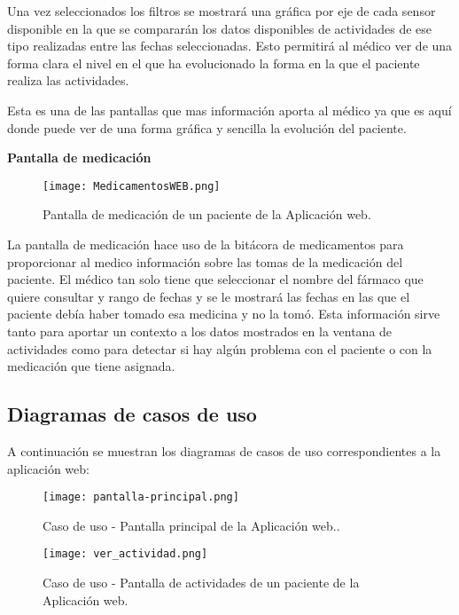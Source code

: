 \documentclass[11pt,spanish]{article}
\begin{document}
Una vez seleccionados los filtros se mostrará una gráfica por eje de cada sensor disponible en la que se compararán los datos disponibles de actividades de ese tipo realizadas entre las fechas seleccionadas. Esto permitirá al médico ver de una forma clara el nivel en el que ha evolucionado la forma en la que el paciente realiza las actividades.
\newline

Esta es una de las pantallas que mas información aporta al médico ya que es aquí donde puede ver de una forma gráfica y sencilla la evolución del paciente.
\newline
\newpage

\textbf{Pantalla de medicación}
\newline

\begin{figure}[H]
  \centering
  \texttt{[image: MedicamentosWEB.png]}
  \caption{Pantalla de medicación de un paciente de la Aplicación web.}
\end{figure}

La pantalla de medicación hace uso de la bitácora de medicamentos para proporcionar al medico información sobre las tomas de la medicación del paciente. El médico tan solo tiene que seleccionar el nombre del fármaco que quiere consultar y rango de fechas y se le mostrará las fechas en las que el paciente debía haber tomado esa medicina y no la tomó. Esta información sirve tanto para aportar un contexto a los datos mostrados en la ventana de actividades como para detectar si hay algún problema con el paciente o con la medicación que tiene asignada.

\subsection{Diagramas de casos de uso}

A continuación se muestran los diagramas de casos de uso correspondientes a la aplicación web:
\newline

\begin{figure}[H]
  \centering
  \texttt{[image: pantalla-principal.png]}
  \caption{Caso de uso - Pantalla principal de la Aplicación web..}
\end{figure}

\begin{figure}[H]
  \centering
  \texttt{[image: ver\_actividad.png]}
  \caption{Caso de uso - Pantalla de actividades de un paciente de la Aplicación web.}
\end{figure}
\end{document}
